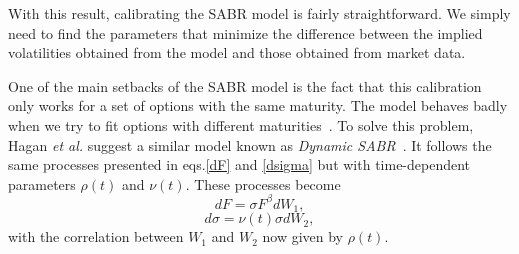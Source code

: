 With this result, calibrating the SABR model is fairly straightforward. We simply need to find the parameters that minimize the difference between the implied volatilities obtained from the model and those obtained from market data.

One of the main setbacks of the SABR model is the fact that this calibration only works for a set of options with the same maturity. The model behaves badly when we try to fit options with different maturities~\cite{Hagan}. To solve this problem, Hagan \textit{et al.} suggest a similar model known as \emph{Dynamic SABR}~\cite{Hagan}. It follows the same processes presented in eqs.\eqref{dF} and \eqref{dsigma} but with time-dependent parameters $\rho(t)$ and $\nu(t)$.
These processes become
\begin{equation}\label{dF2}
dF=\sigma F^\beta dW_1,
\end{equation}
\begin{equation}\label{dsigma2}
d\sigma=\nu(t)\sigma dW_2,
\end{equation}
\noindent with the correlation between $W_1$ and $W_2$ now given by $\rho(t)$.

